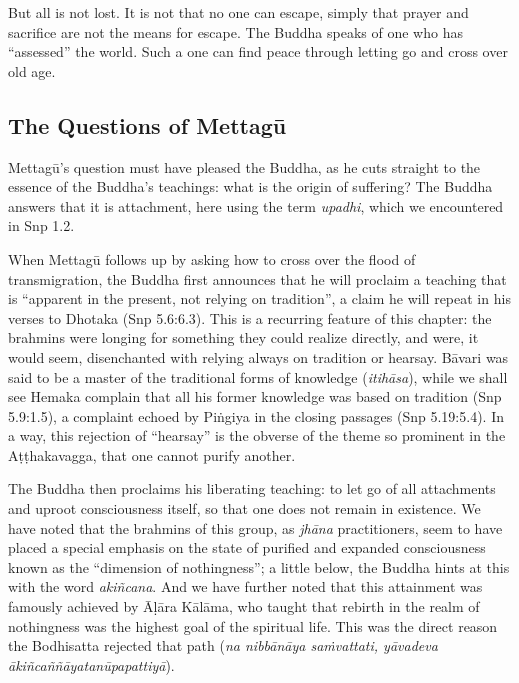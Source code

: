 \documentclass[12pt,openany]{book}%
\begin{document}
But all is not lost. It is not that no one can escape, simply that prayer and sacrifice are not the means for escape. The Buddha speaks of one who has “assessed” the world. Such a one can find peace through letting go and cross over old age.

\subsection*{The Questions of \textsanskrit{Mettagū}}

\textsanskrit{Mettagū}’s question must have pleased the Buddha, as he cuts straight to the essence of the Buddha’s teachings: what is the origin of suffering? The Buddha answers that it is attachment, here using the term \textit{upadhi}, which we encountered in Snp 1.2.

When \textsanskrit{Mettagū} follows up by asking how to cross over the flood of transmigration, the Buddha first announces that he will proclaim a teaching that is “apparent in the present, not relying on tradition”, a claim he will repeat in his verses to Dhotaka (Snp 5.6:6.3). This is a recurring feature of this chapter: the brahmins were longing for something they could realize directly, and were, it would seem, disenchanted with relying always on tradition or hearsay. \textsanskrit{Bāvari} was said to be a master of the traditional forms of knowledge (\textit{\textsanskrit{itihāsa}}), while we shall see Hemaka complain that all his former knowledge was based on tradition (Snp 5.9:1.5), a complaint echoed by \textsanskrit{Piṅgiya} in the closing passages (Snp 5.19:5.4). In a way, this rejection of “hearsay” is the obverse of the theme so prominent in the \textsanskrit{Aṭṭhakavagga}, that one cannot purify another.

The Buddha then proclaims his liberating teaching: to let go of all attachments and uproot consciousness itself, so that one does not remain in existence. We have noted that the brahmins of this group, as \textit{\textsanskrit{jhāna}} practitioners, seem to have placed a special emphasis on the state of purified and expanded consciousness known as the “dimension of nothingness”; a little below, the Buddha hints at this with the word \textit{\textsanskrit{akiñcana}}. And we have further noted that this attainment was famously achieved by \textsanskrit{Āḷāra} \textsanskrit{Kālāma}, who taught that rebirth in the realm of nothingness was the highest goal of the spiritual life. This was the direct reason the Bodhisatta rejected that path (\textit{na \textsanskrit{nibbānāya} \textsanskrit{saṁvattati}, \textsanskrit{yāvadeva} \textsanskrit{ākiñcaññāyatanūpapattiyā}}).
\end{document}
